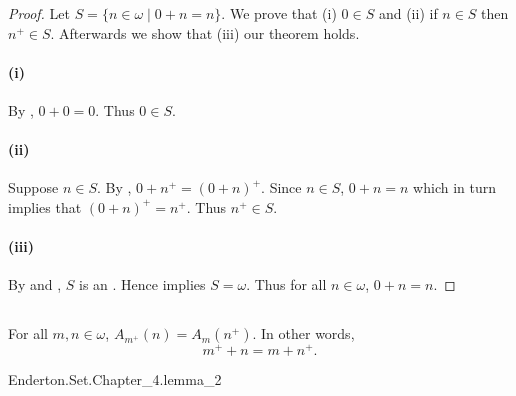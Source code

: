 \documentclass{report}
\begin{document}
  \begin{proof}

    Let $S = \{n \in \omega \mid 0 + n = n\}$.
    We prove that (i) $0 \in S$ and (ii) if $n \in S$ then $n^+ \in S$.
    Afterwards we show that (iii) our theorem holds.

    \paragraph{(i)}%

      By , $0 + 0 = 0$.
      Thus $0 \in S$.

    \paragraph{(ii)}%

      Suppose $n \in S$.
      By , $0 + n^+ = (0 + n)^+$.
      Since $n \in S$, $0 + n = n$ which in turn implies that $(0 + n)^+ = n^+$.
      Thus $n^+ \in S$.

    \paragraph{(iii)}%

      By  and
        , $S$ is an
        .
      Hence  implies $S = \omega$.
      Thus for all $n \in \omega$, $0 + n = n$.

  \end{proof}

\subsection{}%

  \begin{lemma}
    For all $m, n \in \omega$, $A_{m^+}(n) = A_m(n^+)$.
    In other words, $$m^+ + n = m + n^+.$$
  \end{lemma}

    {Enderton.Set.Chapter\_4.lemma\_2}

\end{document}
